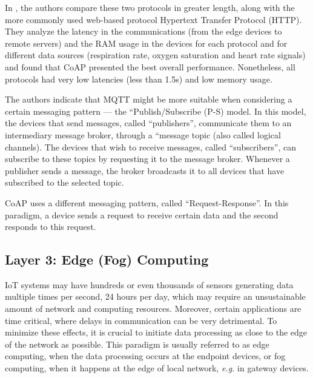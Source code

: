 In \cite{Rubi2019}, the authors compare these two protocols in greater length, along with the more commonly used web-based protocol Hypertext Transfer Protocol (HTTP). They analyze the latency in the communications (from the edge devices to remote servers) and the RAM usage in the devices for each protocol and for different data sources (respiration rate, oxygen saturation and heart rate signals) and found that \acs{CoAP} presented the best overall performance. Nonetheless, all protocols had very low latencies (less than 1.5s) and low memory usage. \bigskip

The authors indicate that \acs{MQTT} might be more suitable when considering a certain messaging pattern — the ``Publish/Subscribe (P-S) model. In this model, the devices that send messages, called ``publishers'', communicate them to an intermediary message broker, through a ``message topic (also called logical channels). The devices that wish to receive messages, called ``subscribers'', can subscribe to these topics by requesting it to the message broker. Whenever a publisher sends a message, the broker broadcasts it to all devices that have subscribed to the selected topic. \bigskip

\acs{CoAP} uses a different messaging pattern, called ``Request-Response''. In this paradigm, a device sends a request to receive certain data and the second responds to this request. %

\subsection{Layer 3: Edge (Fog) Computing}
\label{sec:iot-model-layer3}

\acs{IoT} systems may have hundreds or even thousands of sensors generating data multiple times per second, 24 hours per day, which may require an unsustainable amount of network and computing resources. Moreover, certain applications are time critical, where delays in communication can be very detrimental. To minimize these effects, it is crucial to initiate data processing as close to the edge of the network as possible. This paradigm is usually referred to as edge computing, when the data processing occurs at the endpoint devices, or fog computing, when it happens at the edge of local network, \textit{e.g.} in gateway devices. \bigskip

